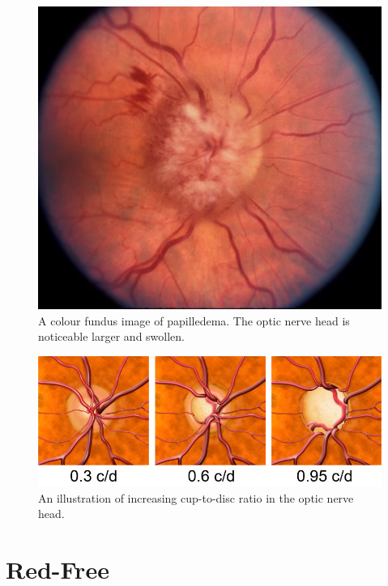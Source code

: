\begin{figure}[htbp]
\centering
\includegraphics{figures/papilledema}
\caption{A colour fundus image of papilledema. The optic nerve head is noticeable larger and swollen.}
\label{fig:pap}
   \end{figure}

\begin{figure}[htbp]
\centering
\includegraphics{figures/opticnervecupping}
\caption{An illustration of increasing cup-to-disc ratio in the optic nerve head.}
\label{fig:cup}
   \end{figure}

	

\section{Red-Free}

